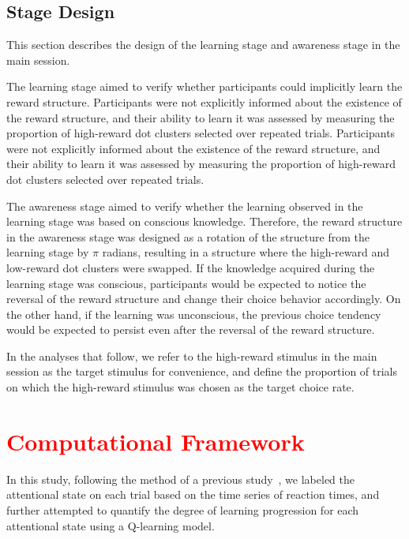 \documentclass[dvipdfmx]{article}
\begin{document}
\subsection{Stage Design}
This section describes the design of the learning stage and awareness stage in the main session.

The learning stage aimed to verify whether participants could implicitly learn the reward structure.
Participants were not explicitly informed about the existence of the reward structure,
and their ability to learn it was assessed by measuring the proportion of high-reward dot clusters selected over repeated trials.
Participants were not explicitly informed about the existence of the reward structure,
and their ability to learn it was assessed by measuring the proportion of high-reward dot clusters selected over repeated trials.

The awareness stage aimed to verify whether the learning observed in the learning stage was based on conscious knowledge.
Therefore, the reward structure in the awareness stage was designed as a rotation of the structure from the learning stage by $\pi$ radians,
resulting in a structure where the high-reward and low-reward dot clusters were swapped.
If the knowledge acquired during the learning stage was conscious, participants would be expected to notice the reversal of the reward structure and change their choice behavior accordingly.
On the other hand, if the learning was unconscious, the previous choice tendency would be expected to persist even after the reversal of the reward structure.

In the analyses that follow, we refer to the high-reward stimulus in the main session as the target stimulus for convenience,
and define the proportion of trials on which the high-reward stimulus was chosen as the target choice rate.


\section{\textcolor{red}{Computational Framework}}
In this study, following the method of a previous study~\cite{decker2023pay}, we labeled the attentional state on each trial based on the time series of reaction times,
and further attempted to quantify the degree of learning progression for each attentional state using a Q-learning model.
\end{document}
